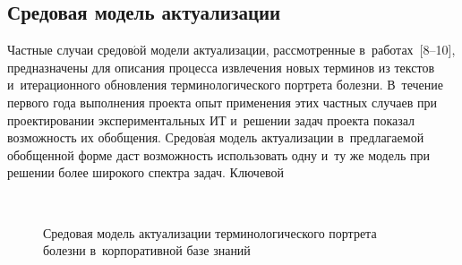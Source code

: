 \begin{multicols}{2}
\vspace*{-6pt}
  
\section{Средовая модель актуализации}

\vspace*{-4pt}

  Частные случаи средов$\acute{\mbox{о}}$й модели актуализации, 
рассмотренные в~работах~[8--10], предназначены для описания процесса 
извлечения новых терминов из текстов и~итерационного обновления 
терминологического портрета болезни. В~течение первого года выполнения 
проекта опыт применения этих частных случаев при проектировании 
экспериментальных ИТ и~решении задач проекта показал возможность их 
обобщения. Средов$\acute{\mbox{а}}$я модель актуализации в~предлагаемой 
обобщенной форме даст возможность использовать одну и~ту же модель при 
решении более широкого спектра задач. Ключевой\linebreak\vspace*{-12pt}

\pagebreak

\end{multicols}

\begin{figure*} %
 \vspace*{1pt}
\begin{center}
     \mbox{%
\epsfxsize=163mm
}

\vspace*{6pt}

{\small Средовая модель актуализации терминологического портрета 
болезни в~корпоративной базе знаний}
\end{center}
\vspace*{-12pt}
\end{figure*}


